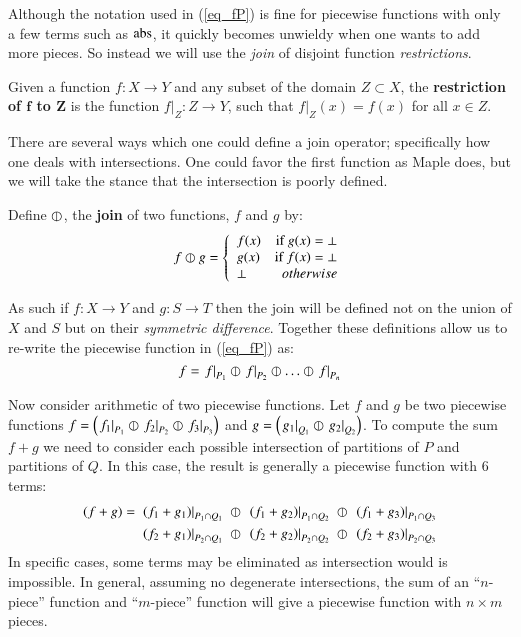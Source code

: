 Although the notation used in (\ref{eq_fP}) is fine for piecewise functions with only a few terms such as $\text{abs}$,
it quickly becomes unwieldy when one wants to add more pieces.
So instead we will use the \emph{join} of disjoint function \emph{restrictions}.
\begin{definition}
	Given a function $f:X \to Y$ and any subset of the domain $Z \subset X$, 
	the \textbf{restriction of $\boldsymbol{f}$ to $\boldsymbol{Z}$} is the function $f|_Z : Z \to Y$, 
	such that $f|_Z(x) = f(x)$ for all $x \in Z$.
\end{definition}


There are several ways which one could define a join operator; specifically how one deals with intersections.
One could favor the first function as Maple does, but we will take the stance that the intersection is poorly defined.
\begin{definition}
	Define $\varobar$, the \textbf{join} of two functions, $f$ and $g$ by:
	\begin{equation}
	\label{def:fjoin}
		f \varobar g =  
		\left\{
	     		\begin{array}{lr}
	       		f(x) & \text{if } g(x) = \bot \\
	       		g(x) & \text{if } f(x) = \bot \\
	       		\bot & otherwise
	     		\end{array}
	   	\right.
	\end{equation}
\end{definition}
As such if $f:X \to Y$ and $g:S \to T$ then the join will be defined not on the union of $X$ and $S$ but on their 
\emph{symmetric difference}.
Together these definitions allow us to re-write the piecewise function in (\ref{eq_fP}) as:
\begin{equation*}
	f = \left.f\right|_{P_1} \varobar \left.f\right|_{P_2} \varobar \ldots \varobar \left.f\right|_{P_n}
\end{equation*}


Now consider arithmetic of two piecewise functions. Let $f$ and $g$ be two piecewise functions
$f = \left(\left.f_1\right|_{P_1} \varobar \left.f_2\right|_{P_2} \varobar \left.f_3\right|_{P_3} \right)$ 
and $g= \left( \left.g_1\right|_{Q_1} \varobar \left.g_2\right|_{Q_2} \right)$.
To compute the sum $f+g$ we need to consider each possible intersection of partitions of $P$ and partitions of $Q$.
In this case, the result is generally a piecewise function with 6 terms:
\begin{align*}
	(f+g) = \;
	&\left.(f_1+g_1)\right|_{P_1 \cap Q_1} 
		\;\varobar\; \left.(f_1+g_2)\right|_{P_1 \cap Q_2} 
		\;\varobar\; \left.(f_1+g_3)\right|_{P_1 \cap Q_3}\notag\\
	&\left.(f_2+g_1)\right|_{P_2 \cap Q_1} 
	 	\;\varobar\; \left.(f_2+g_2)\right|_{P_2 \cap Q_2} 
	 	\;\varobar\; \left.(f_2+g_3)\right|_{P_2 \cap Q_3}
\end{align*}
In specific cases, some terms may be eliminated as intersection would is impossible.
In general, assuming no degenerate intersections, 
the sum of an ``$n$-piece'' function and ``$m$-piece'' function will give a piecewise function with $n\times m$ pieces.


